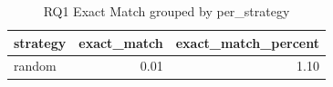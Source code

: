 \begin{table}
\caption{RQ1 Exact Match grouped by per_strategy}
\label{tab:rq1_per_strategy}
\begin{tabular}{lrr}
\toprule
strategy & exact_match & exact_match_percent \\
\midrule
random & 0.01 & 1.10 \\
\bottomrule
\end{tabular}
\end{table}
